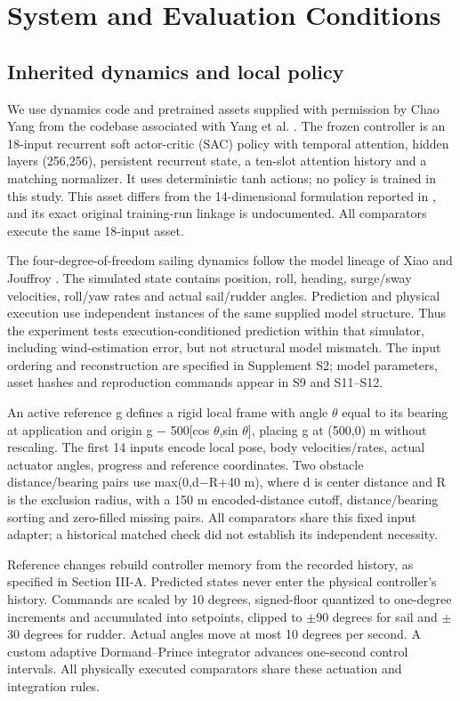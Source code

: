 \documentclass[conference]{IEEEtran}
\begin{document}
\section{System and Evaluation Conditions}

\subsection{Inherited dynamics and local policy}

We use dynamics code and pretrained assets supplied with permission by Chao Yang from the codebase associated with Yang et al. \cite{ref8}. The frozen controller is an 18-input recurrent soft actor-critic (SAC) policy \cite{ref9} with temporal attention, hidden layers (256,256), persistent recurrent state, a ten-slot attention history and a matching normalizer. It uses deterministic tanh actions; no policy is trained in this study. This asset differs from the 14-dimensional formulation reported in \cite{ref8}, and its exact original training-run linkage is undocumented. All comparators execute the same 18-input asset.

The four-degree-of-freedom sailing dynamics follow the model lineage of Xiao and Jouffroy \cite{ref10}. The simulated state contains position, roll, heading, surge/sway velocities, roll/yaw rates and actual sail/rudder angles. Prediction and physical execution use independent instances of the same supplied model structure. Thus the experiment tests execution-conditioned prediction within that simulator, including wind-estimation error, but not structural model mismatch. The input ordering and reconstruction are specified in Supplement S2; model parameters, asset hashes and reproduction commands appear in S9 and S11--S12.

An active reference g defines a rigid local frame with angle \ensuremath{\theta} equal to its bearing at application and origin g \ensuremath{-} 500[cos \ensuremath{\theta},sin \ensuremath{\theta}], placing g at (500,0) m without rescaling. The first 14 inputs encode local pose, body velocities/rates, actual actuator angles, progress and reference coordinates. Two obstacle distance/bearing pairs use max(0,d\ensuremath{-}R+40 m), where d is center distance and R is the exclusion radius, with a 150 m encoded-distance cutoff, distance/bearing sorting and zero-filled missing pairs. All comparators share this fixed input adapter; a historical matched check did not establish its independent necessity.

Reference changes rebuild controller memory from the recorded history, as specified in Section III-A. Predicted states never enter the physical controller's history. Commands are scaled by 10 degrees, signed-floor quantized to one-degree increments and accumulated into setpoints, clipped to \ensuremath{\pm}90 degrees for sail and \ensuremath{\pm}30 degrees for rudder. Actual angles move at most 10 degrees per second. A custom adaptive Dormand--Prince integrator advances one-second control intervals. All physically executed comparators share these actuation and integration rules.
\end{document}
